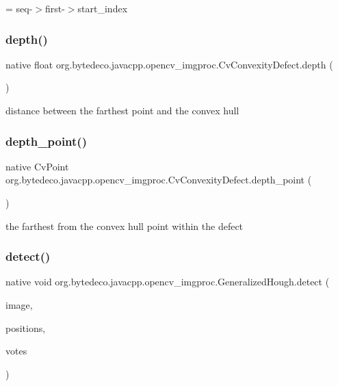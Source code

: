 = seq-\/$>$first-\/$>$start\+\_\+index \mbox{\label{group__imgproc_ga8baffaba023fa380d056b4686becfd86}} 
\subsubsection{\texorpdfstring{depth()}{depth()}}
{\footnotesize\ttfamily native float org.\+bytedeco.\+javacpp.\+opencv\+\_\+imgproc.\+Cv\+Convexity\+Defect.\+depth (\begin{DoxyParamCaption}{ }\end{DoxyParamCaption})}

distance between the farthest point and the convex hull \mbox{\label{group__imgproc_ga7de5f58f386b3cf8bef96739d89a24cb}} 
\subsubsection{\texorpdfstring{depth\+\_\+point()}{depth\_point()}}
{\footnotesize\ttfamily native Cv\+Point org.\+bytedeco.\+javacpp.\+opencv\+\_\+imgproc.\+Cv\+Convexity\+Defect.\+depth\+\_\+point (\begin{DoxyParamCaption}{ }\end{DoxyParamCaption})}

the farthest from the convex hull point within the defect \mbox{\label{group__imgproc_ga85f8c877156761def90adf12f47cf2d7}} 
\subsubsection{\texorpdfstring{detect()}{detect()}\hspace{0.1cm}{\footnotesize\ttfamily [1/2]}}
{\footnotesize\ttfamily native void org.\+bytedeco.\+javacpp.\+opencv\+\_\+imgproc.\+Generalized\+Hough.\+detect (\begin{DoxyParamCaption}\item[{@By\+Val Mat}]{image,  }\item[{@By\+Val Mat}]{positions,  }\item[{@By\+Val(null\+Value=\char`\"{}cv\+::\+Output\+Array(cv\+::no\+Array())\char`\"{}) Mat}]{votes }\end{DoxyParamCaption})}

